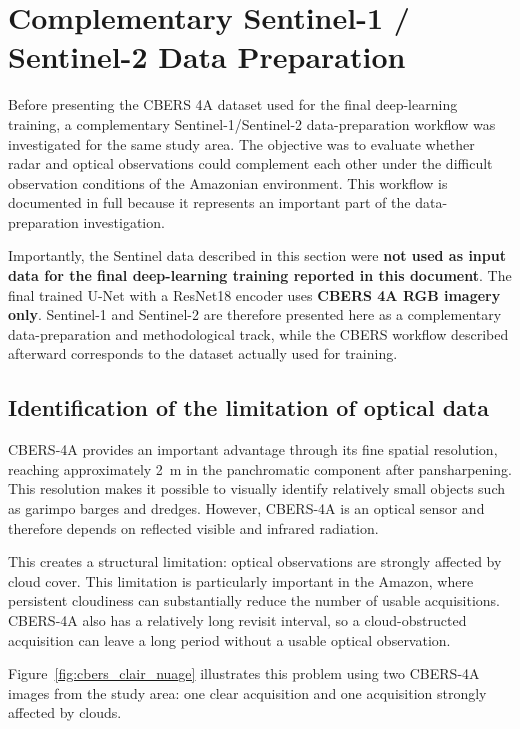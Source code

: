 \documentclass[11pt,a4paper]{article}
\begin{document}
\section{Complementary Sentinel-1 / Sentinel-2 Data Preparation}
\label{sec:sentinel_data_prep}

Before presenting the CBERS 4A dataset used for the final deep-learning training, a complementary Sentinel-1/Sentinel-2 data-preparation workflow was investigated for the same study area. The objective was to evaluate whether radar and optical observations could complement each other under the difficult observation conditions of the Amazonian environment. This workflow is documented in full because it represents an important part of the data-preparation investigation.

Importantly, the Sentinel data described in this section were \textbf{not used as input data for the final deep-learning training reported in this document}. The final trained U-Net with a ResNet18 encoder uses \textbf{CBERS 4A RGB imagery only}. Sentinel-1 and Sentinel-2 are therefore presented here as a complementary data-preparation and methodological track, while the CBERS workflow described afterward corresponds to the dataset actually used for training.

\subsection{Identification of the limitation of optical data}

CBERS-4A provides an important advantage through its fine spatial resolution, reaching approximately 2~m in the panchromatic component after pansharpening. This resolution makes it possible to visually identify relatively small objects such as garimpo barges and dredges. However, CBERS-4A is an optical sensor and therefore depends on reflected visible and infrared radiation.

This creates a structural limitation: optical observations are strongly affected by cloud cover. This limitation is particularly important in the Amazon, where persistent cloudiness can substantially reduce the number of usable acquisitions. CBERS-4A also has a relatively long revisit interval, so a cloud-obstructed acquisition can leave a long period without a usable optical observation.

Figure~\ref{fig:cbers_clair_nuage} illustrates this problem using two CBERS-4A images from the study area: one clear acquisition and one acquisition strongly affected by clouds.
\end{document}
